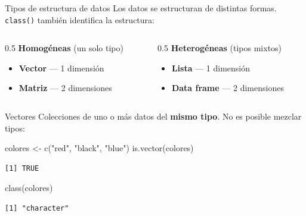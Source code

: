 \documentclass[
  9pt,
  ignorenonframetext,
]{beamer}
\newenvironment{Shaded}{\begin{snugshade}}{\end{snugshade}}
\newcommand{\FunctionTok}[1]{\textcolor[rgb]{0.28,0.35,0.67}{#1}}
\newcommand{\NormalTok}[1]{\textcolor[rgb]{0.00,0.23,0.31}{#1}}
\newcommand{\OtherTok}[1]{\textcolor[rgb]{0.00,0.23,0.31}{#1}}
\newcommand{\StringTok}[1]{\textcolor[rgb]{0.13,0.47,0.30}{#1}}
\providecommand{\tightlist}{%
  \setlength{\itemsep}{0pt}\setlength{\parskip}{0pt}}\usepackage{longtable,booktabs,array}
\begin{document}
\begin{frame}[fragile]{Tipos de estructura de datos}
\label{tipos-de-estructura-de-datos}
Los datos se estructuran de distintas formas. \texttt{class()} también
identifica la estructura:

\begin{columns}[T]
\begin{column}{0.5\textwidth}
\textbf{Homogéneas} (un solo tipo)

\begin{itemize}
\tightlist
\item
  \textbf{Vector} --- 1 dimensión
\item
  \textbf{Matriz} --- 2 dimensiones
\end{itemize}
\end{column}

\begin{column}{0.5\textwidth}
\textbf{Heterogéneas} (tipos mixtos)

\begin{itemize}
\tightlist
\item
  \textbf{Lista} --- 1 dimensión
\item
  \textbf{Data frame} --- 2 dimensiones
\end{itemize}
\end{column}
\end{columns}
\end{frame}

\begin{frame}[fragile]{Vectores}
\label{vectores}
Colecciones de uno o más datos del \textbf{mismo tipo}. No es posible
mezclar tipos:

\begin{Shaded}
\begin{Highlighting}[]
\NormalTok{colores }\OtherTok{\textless{}{-}} \FunctionTok{c}\NormalTok{(}\StringTok{"red"}\NormalTok{, }\StringTok{"black"}\NormalTok{, }\StringTok{"blue"}\NormalTok{)}
\FunctionTok{is.vector}\NormalTok{(colores)}
\end{Highlighting}
\end{Shaded}

\begin{verbatim}
[1] TRUE
\end{verbatim}

\begin{Shaded}
\begin{Highlighting}[]
\FunctionTok{class}\NormalTok{(colores)}
\end{Highlighting}
\end{Shaded}

\begin{verbatim}
[1] "character"
\end{verbatim}
\end{frame}
\end{document}
